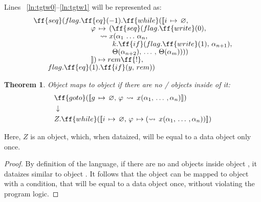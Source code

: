 \documentclass[sigplan,review,11pt,nonacm,natbib=false]{acmart}
\theoremstyle{theorems}
\newtheorem{eotheorem}{Theorem}
\newcommand\br{\\[-4pt]}
\begin{document}
Lines ~\ref{ln:tgtw0}--\ref{ln:tgtw1} will be represented as:
\begin{equation}
\begin{split}
& \ff{seq}(flag.\ff{eq}(-1).\ff{while}(\llbracket i\,\mapsto\,\varnothing,\br
& \quad \quad \quad \quad \quad \quad \quad \quad \varphi\,\mapsto\,(\ff{seq}(flag.\ff{write}(0), \br
& \quad \quad \quad \quad \quad \quad \quad \quad \quad \leadsto x(\alpha_1\,\ldots\,\alpha_n, \br
& \quad \quad \quad \quad \quad \quad \quad \quad \quad \quad \quad k.\ff{if}(flag.\ff{write}(1),\,\alpha_{n+1}), \br
& \quad \quad \quad \quad \quad \quad \quad \quad \quad \quad \quad \Theta(\alpha_{n+2}),\,\ldots\,,\,\Theta(\alpha_m)))) \br
& \quad \quad \quad \quad \quad \quad \quad \quad \rrbracket)\mapsto rem\ff{!}, \br
& \quad \quad flag.\ff{eq}(1).\ff{if}(y,\,rem)) \\
\end{split}
\end{equation}

\begin{eotheorem}
Object  maps to object  if there are no / objects inside of it:
\begin{equation*}
\begin{split}
& \ff{goto}(\llbracket g\,\mapsto\,\varnothing,\,\varphi\,\leadsto\,x(\alpha_1,\,\ldots\,,\alpha_n)\rrbracket) \\
& \downarrow \\
& Z.\ff{while}(\llbracket i\,\mapsto\,\varnothing,\,\varphi\,\mapsto(\leadsto\,x(\alpha_1,\,\ldots\,,\alpha_n))\rrbracket) \\
\end{split}
\end{equation*}
\end{eotheorem}
Here, $Z$ is an object, which, when dataized, will be equal to a data object  only once.

\begin{proof}
By definition of the language, if there are no  and  objects inside object , it dataizes similar to object .
It follows that the  object can be mapped to object  with a condition, that will be equal to a data object  once, without violating the program logic.
\end{proof}
\end{document}
